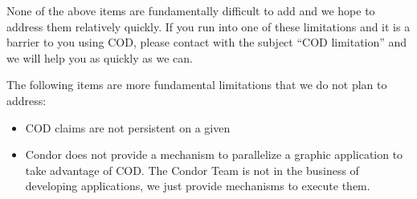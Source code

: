 None of the above items are fundamentally difficult to add and we hope
to address them relatively quickly.
If you run into one of these limitations and it is a barrier to you
using COD, please contact  with the
subject ``COD limitation'' and we will help you as quickly as we can.

The following items are more fundamental limitations that we do not
plan to address:

\begin{itemize}

\item COD claims are not persistent on a given 

\item Condor does not provide a mechanism to parallelize a graphic
  application to take advantage of COD.  
  The Condor Team is not in the business of developing applications,
  we just provide mechanisms to execute them.

\end{itemize}
